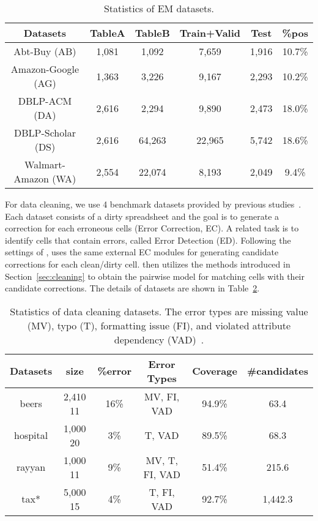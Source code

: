 \setlength{\tabcolsep}{2.5pt}
\begin{table}[!t]
\caption{Statistics of EM datasets. }\label{tab:em_dataset}
\small
\begin{tabular}{cccccc} \toprule
Datasets            & TableA & TableB & Train+Valid & Test & \%pos   \\ \midrule
Abt-Buy (AB)        & 1,081   & 1,092   & 7,659        & 1,916 & 10.7\% \\
Amazon-Google (AG)  & 1,363   & 3,226   & 9,167        & 2,293 & 10.2\% \\
DBLP-ACM (DA)       & 2,616   & 2,294   & 9,890        & 2,473 & 18.0\% \\
DBLP-Scholar (DS)   & 2,616   & 64,263  & 22,965       & 5,742 & 18.6\% \\
Walmart-Amazon (WA) & 2,554   & 22,074  & 8,193        & 2,049 & 9.4\% \\ \bottomrule
\end{tabular}
\vspace{-3mm}
\end{table}

For data cleaning, we use 4 benchmark datasets provided by previous studies~\cite{DBLP:journals/pvldb/MahdaviA20,DBLP:conf/sigmod/MahdaviAFMOS019}.
Each dataset consists of a dirty spreadsheet and the goal is to generate a correction for each erroneous cells
(Error Correction, EC). A related task is to identify cells that contain errors, called Error Detection (ED).
Following the settings of \baran,
\system uses the same external EC modules for generating candidate corrections for each clean/dirty cell.
\system then utilizes the methods introduced in Section~\ref{sec:cleaning} to obtain the pairwise model for matching cells with their candidate corrections.
The details of datasets are shown in Table~\ref{tab:cleaning_dataset}.


\setlength{\tabcolsep}{2pt}
\begin{table}[!ht]
\caption{Statistics of data cleaning datasets. The error types are missing value (MV), typo (T), formatting issue (FI),
and violated attribute dependency (VAD)~\cite{DBLP:journals/pvldb/MahdaviA20}. 
}\label{tab:cleaning_dataset}
\small
\begin{tabular}{cccccc} \toprule
Datasets & size & \%error & Error Types    &  Coverage & \#candidates \\ \midrule
beers    & 2,410  11        & 16\%    & MV, FI, VAD    & 94.9\%       & 63.4         \\
hospital & 1,000  20        & 3\%     & T, VAD         & 89.5\%       & 68.3         \\
rayyan   & 1,000  11        & 9\%     & MV, T, FI, VAD & 51.4\%       & 215.6         \\
tax*      & 5,000  15        & 4\%     & T, FI, VAD     & 92.7\%       & 1,442.3        \\ \bottomrule
\end{tabular}\vspace{-3mm}
\end{table}


